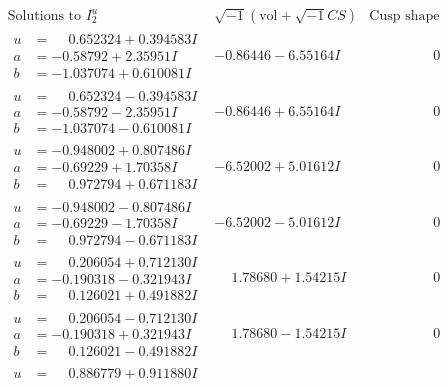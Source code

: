 \documentclass[1p]{elsarticle_modified}
\theoremstyle{definition}
\newcommand{\I}{\sqrt{-1}}
\begin{document}
$$\begin{array}{c|c|c}
\text{Solutions to }I^u_{2}& \I (\text{vol} + \sqrt{-1}CS) & \text{Cusp shape}\\
 \hline 
\begin{aligned}
u &= \phantom{-}0.652324 + 0.394583 I \\
a &= -0.58792 + 2.35951 I \\
b &= -1.037074 + 0.610081 I\end{aligned}
 & -0.86446 - 6.55164 I & \phantom{-0.000000 } 0 \\ \hline\begin{aligned}
u &= \phantom{-}0.652324 - 0.394583 I \\
a &= -0.58792 - 2.35951 I \\
b &= -1.037074 - 0.610081 I\end{aligned}
 & -0.86446 + 6.55164 I & \phantom{-0.000000 } 0 \\ \hline\begin{aligned}
u &= -0.948002 + 0.807486 I \\
a &= -0.69229 + 1.70358 I \\
b &= \phantom{-}0.972794 + 0.671183 I\end{aligned}
 & -6.52002 + 5.01612 I & \phantom{-0.000000 } 0 \\ \hline\begin{aligned}
u &= -0.948002 - 0.807486 I \\
a &= -0.69229 - 1.70358 I \\
b &= \phantom{-}0.972794 - 0.671183 I\end{aligned}
 & -6.52002 - 5.01612 I & \phantom{-0.000000 } 0 \\ \hline\begin{aligned}
u &= \phantom{-}0.206054 + 0.712130 I \\
a &= -0.190318 - 0.321943 I \\
b &= \phantom{-}0.126021 + 0.491882 I\end{aligned}
 & \phantom{-}1.78680 + 1.54215 I & \phantom{-0.000000 } 0 \\ \hline\begin{aligned}
u &= \phantom{-}0.206054 - 0.712130 I \\
a &= -0.190318 + 0.321943 I \\
b &= \phantom{-}0.126021 - 0.491882 I\end{aligned}
 & \phantom{-}1.78680 - 1.54215 I & \phantom{-0.000000 } 0 \\ \hline\begin{aligned}
u &= \phantom{-}0.886779 + 0.911880 I \\

\end{aligned}
\end{array}$$
\end{document}
